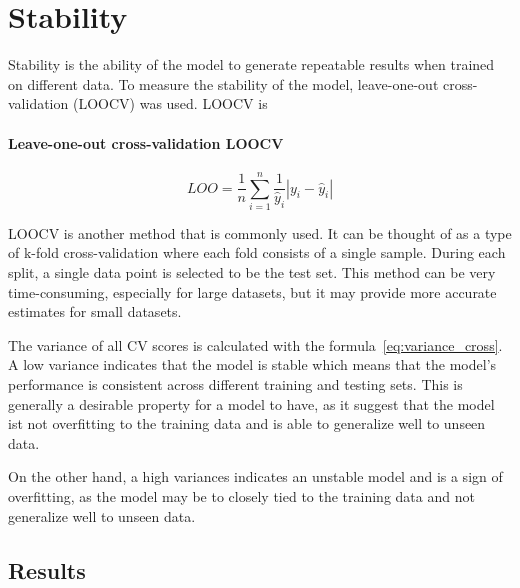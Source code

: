 \section{Stability}
Stability is the ability of the model to generate repeatable results when trained on different data. \cite[p. 16]{siebert_constructionqualitymodel_}
To measure the stability of the model, leave-one-out cross-validation (\ac{LOOCV}) was used.
\ac{LOOCV} is


\paragraph*{Leave-one-out cross-validation \ac{LOOCV}}

\begin{equation}
    \label{eq:loo}
    LOO = \frac{1}{n} \sum_{i=1}^{n} \frac{1}{\hat{y}_i} |y_i - \hat{y}_i|
\end{equation}

\ac{LOOCV} is another method that is commonly used. It can be thought of as a type of k-fold cross-validation where each fold consists of a single sample. During each split, a single data point is selected to be the test set. This method can be very time-consuming, especially for large datasets, but it may provide more accurate estimates for small datasets. \cite[p. 257-258]{muller_introductionmachinelearning_2016}

The variance of all \ac{CV} scores is calculated with the formula~\ref{eq:variance_cross}.
A low variance indicates that the model is stable which means that the model's performance is consistent across different training and testing sets. This is generally  a desirable property for a model to have, as it suggest that the model ist not overfitting to the training data and is able to generalize well to unseen data.

On the other hand, a high variances indicates an unstable model and is a sign of overfitting, as the model may be to closely tied to the training data and not generalize well to unseen data.

\subsection{Results}

